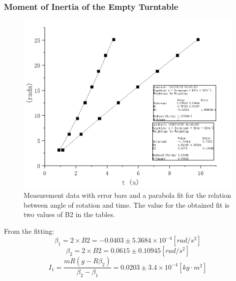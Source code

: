 \documentclass[12pt]{article}
\begin{document}
\subsubsection{Moment of Inertia of the Empty Turntable}
\begin{figure}[H]
\centering
\includegraphics[width=1\linewidth]{P1.jpg}
\caption{Measurement data with error bars and a parabola fit for the relation between angle of rotation and time. The value for the obtained fit is two values of B2 in the tables.}
\end{figure}
From the fitting:
$$\beta_1=2\times{B2}=-0.0403\pm5.3684\times10^{-4}[rad/s^2]$$
$$\beta_2=2\times{B2}=0.0615\pm0.10945[rad/s^2]$$
$$I_1=\frac{mR(g-R\beta_2)}{\beta_2-\beta_1}=0.0203\pm3.4\times10^{-4}[kg\cdot{m^2}]$$
\end{document}
